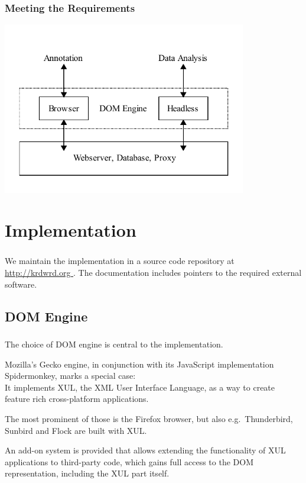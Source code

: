 \documentclass{beamer}
\begin{document}
        \begin{frame}
            \frametitle{Meeting the Requirements}
            \begin{center}
                \includegraphics[width=0.8\textwidth]{arch}
            \end{center}
        \end{frame}

\section{Implementation}

    \begin{frame}
        \frametitle{}
        \begin{block}{}
            We maintain the implementation in a source code repository at \url{http://krdwrd.org
            }.
            The documentation includes pointers to the required external software.
        \end{block}
    \end{frame}

    \subsection{DOM Engine}

        \begin{frame}
            \frametitle{}
            \begin{block}{}
                The choice of DOM engine is central to the implementation.

\pause
\medskip
                Mozilla's Gecko engine, in conjunction with its JavaScript implementation Spidermonkey, marks a special case: \\
                It implements XUL, the XML User Interface Language, as a way to create feature rich cross-platform applications.

\pause
\medskip
                The most prominent of those is the Firefox browser, but also e.g.~Thunderbird, Sunbird and Flock are built with XUL.
               
\pause
\medskip
                An add-on system is provided that allows extending the functionality of XUL applications to third-party code, which gains full access to the DOM representation, including the XUL part itself.
            \end{block}
        \end{frame}
\end{document}
